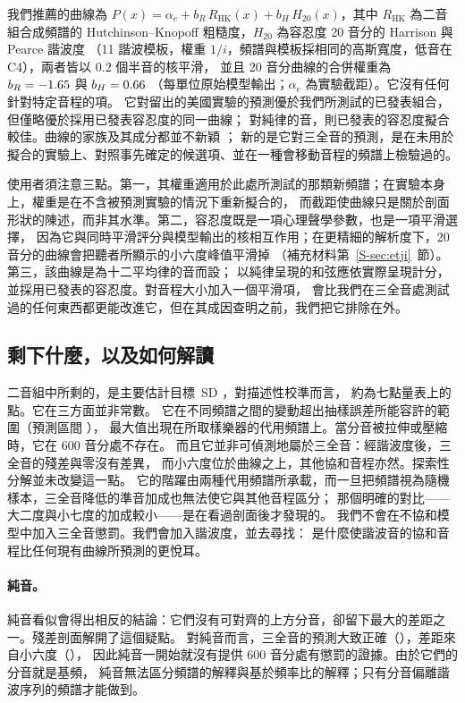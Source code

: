 \documentclass[11pt,a4paper]{article}
\newcommand{\SDu}{\,SD}
\begin{document}
我們推薦的曲線為
$P(x)=\alpha_e+b_R\,R_{\mathrm{HK}}(x)+b_H\,H_{20}(x)$，其中 $R_{\mathrm{HK}}$ 為二音組合成頻譜的
Hutchinson--Knopoff 粗糙度，$H_{20}$ 為容忍度 20 音分的 Harrison 與 Pearce 諧波度
（11 諧波模板，權重 $1/i$，頻譜與模板採相同的高斯寬度，低音在 C4），兩者皆以 0.2 個半音的核平滑，
並且 20 音分曲線的合併權重為 $b_R=-{}1.65$ 與 $b_H=0.66$
（每單位原始模型輸出；$\alpha_e$ 為實驗截距）。它沒有任何針對特定音程的項。
它對留出的美國實驗的預測優於我們所測試的已發表組合，但僅略優於採用已發表容忍度的同一曲線；
對純律的音，則已發表的容忍度擬合較佳。曲線的家族及其成分都並不新穎
\citep{parncutt2019,harrison2020,marjieh2024,masina2022}；
新的是它對三全音的預測，是在未用於擬合的實驗上、對照事先確定的候選項、並在一種會移動音程的頻譜上檢驗過的。

使用者須注意三點。第一，其權重適用於此處所測試的那類新頻譜；在實驗本身上，權重是在不含被預測實驗的情況下重新擬合的，
而截距使曲線只是關於剖面形狀的陳述，而非其水準。第二，容忍度既是一項心理聲學參數，也是一項平滑選擇，
因為它與同時平滑評分與模型輸出的核相互作用；在更精細的解析度下，20 音分的曲線會把聽者所顯示的小六度峰值平滑掉
（補充材料第~\ref{S-sec:etji}~節）。第三，該曲線是為十二平均律的音而設；
以純律呈現的和弦應依實際呈現計分，並採用已發表的容忍度。對音程大小加入一個平滑項，
會比我們在三全音處測試過的任何東西都更能改進它，但在其成因查明之前，我們把它排除在外。

\subsection{剩下什麼，以及如何解讀}
\label{sec:discussion-remains}
二音組中所剩的，是主要估計目標 \primGap\SDu{} \primGapCI，對描述性校準而言，
約為七點量表上的 \poolGapHKHHarmRaw{} 點。它在三方面並非常數。
它在不同頻譜之間的變動超出抽樣誤差所能容許的範圍（預測區間 \primGapPI），
最大值出現在所取樣樂器的代用頻譜上。當分音被拉伸或壓縮時，它在 600 音分處不存在。
而且它並非可偵測地屬於三全音：經諧波度後，三全音的殘差與零沒有差異，
而小六度位於曲線之上，其他協和音程亦然。探索性分解並未改變這一點。
它的階躍由兩種代用頻譜所承載，而一旦把頻譜視為隨機樣本，三全音降低的準音加成也無法使它與其他音程區分；
那個明確的對比——大二度與小七度的加成較小——是在看過剖面後才發現的。
我們不會在不協和模型中加入三全音懲罰。我們會加入諧波度，並去尋找：
是什麼使諧波音的協和音程比任何現有曲線所預測的更悅耳。

\paragraph{純音。}
純音看似會得出相反的結論：它們沒有可對齊的上方分音，卻留下最大的差距之一。殘差剖面解開了這個疑點。
對純音而言，三全音的預測大致正確（\rpfPureTwSix），差距來自小六度（\rpfPureTwEight），
因此純音一開始就沒有提供 600 音分處有懲罰的證據。由於它們的分音就是基頻，
純音無法區分頻譜的解釋與基於頻率比的解釋；只有分音偏離諧波序列的頻譜才能做到。
\end{document}
